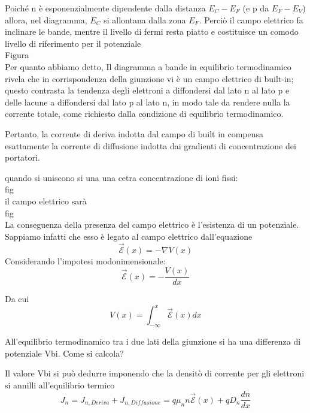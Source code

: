 Poiché n è esponenzialmente dipendente dalla distanza $E_C-E_F$ (e p da $E_F-E_V$) allora, nel diagramma, $E_C$ si allontana dalla zona $E_F$.
Perciò il campo elettrico fa inclinare le bande, mentre il livello di fermi resta piatto e costituisce un comodo livello di riferimento per il potenziale\\
Figura\\

Per quanto abbiamo detto, Il diagramma a bande in equilibrio termodinamico rivela che in corrispondenza della giunzione vi è un campo elettrico di built-in;
questo contrasta la tendenza degli elettroni a diffondersi dal lato n al lato p e delle lacune a diffondersi dal lato p al lato n, in modo tale da rendere nulla la corrente totale, come richiesto dalla condizione di equilibrio termodinamico.

Pertanto, la corrente di deriva indotta dal campo di built in compensa esattamente la corrente di diffusione indotta dai gradienti di concentrazione dei portatori.

quando si uniscono si una una cetra concentrazione di ioni fissi:\\
fig\\

il campo elettrico sarà\\
fig\\
La conseguenza della presenza del campo elettrico è l'esistenza di un potenziale. Sappiamo infatti che esso è legato al campo elettrico dall'equazione
\begin{equation}
    \mathcal{\vec{E}}(x)=-\nabla V(x)
\end{equation}
Considerando l'impotesi modonimensionale:
\begin{equation}
    \mathcal{\vec{E}}(x)=-\dfrac{V(x)}{dx}
\end{equation}

Da cui 
\begin{equation}
    V(x)= \int_{-\infty}^{x}\mathcal{\vec{E}}(x)dx
\end{equation}

All'equilibrio termodinamico tra i due lati della giunzione si ha una differenza di potenziale Vbi. Come si calcola?

Il valore Vbi si può dedurre imponendo che la densitò di corrente per gli elettroni si annilli all'equilibrio termico
\begin{equation}
    J_n=J_{n,Deriva} + J_{n,Diffusione} = q \mu_n n \mathcal{\vec{E}}(x) +qD_n \dfrac{dn}{dx}
\end{equation}

